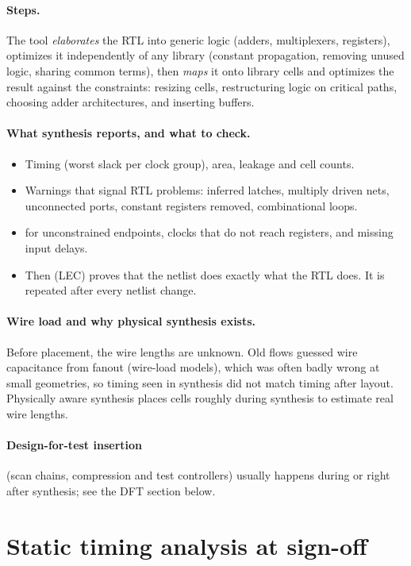 \paragraph{Steps.} The tool \emph{elaborates} the RTL into generic logic (adders, multiplexers, registers), optimizes it independently of any library (constant propagation, removing unused logic, sharing common terms), then \emph{maps} it onto library cells and optimizes the result against the constraints: resizing cells, restructuring logic on critical paths, choosing adder architectures, and inserting buffers.

\paragraph{What synthesis reports, and what to check.}
\begin{itemize}
  \item Timing (worst slack per clock group), area, leakage and cell counts.
  \item Warnings that signal RTL problems: inferred latches, multiply driven nets, unconnected ports, constant registers removed, combinational loops.
  \item {} for unconstrained endpoints, clocks that do not reach registers, and missing input delays.
  \item Then  (LEC) proves that the netlist does exactly what the RTL does. It is repeated after every netlist change.
\end{itemize}

\paragraph{Wire load and why physical synthesis exists.} Before placement, the wire lengths are unknown. Old flows guessed wire capacitance from fanout (wire-load models), which was often badly wrong at small geometries, so timing seen in synthesis did not match timing after layout. Physically aware synthesis places cells roughly during synthesis to estimate real wire lengths.

\paragraph{Design-for-test insertion} (scan chains, compression and test controllers) usually happens during or right after synthesis; see the DFT section below.

\section{Static timing analysis at sign-off}

